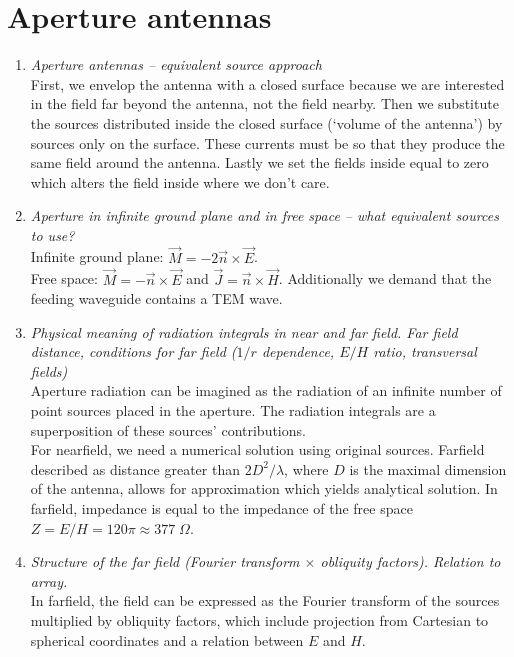 \documentclass[11pt,a4paper]{article}
\begin{document}
\section{Aperture antennas}
\begin{enumerate}

    \item \emph{Aperture antennas -- equivalent source approach}\\
    First, we envelop the antenna with a closed surface because we are interested in the field far beyond the antenna, not the field nearby. Then we substitute the sources distributed inside the closed surface (`volume of the antenna') by sources only on the surface. These currents must be so that they produce the same field around the antenna. Lastly we set the fields inside equal to zero which alters the field inside where we don't care. 
    
    \item \emph{Aperture in infinite ground plane and in free space -- what equivalent sources to use?}\\
    Infinite ground plane: $\vec M = -2\vec n \times \vec E$.\\
    Free space: $\vec M = -\vec n \times \vec E$ and $\vec J = \vec n \times \vec H$. Additionally we demand that the feeding waveguide contains a TEM wave.
    
    \item \emph{Physical meaning of radiation integrals in near and far field. Far field distance, conditions for far field ($1/r$ dependence, $E/H$ ratio, transversal fields)}\\
    Aperture radiation can be imagined as the radiation of an infinite number of point sources placed in the aperture. The radiation integrals are a superposition of these sources' contributions.\\
    For nearfield, we need a numerical solution using original sources. Farfield described as distance greater than $2D^2/\lambda$, where $D$ is the maximal dimension of the antenna, allows for approximation which yields analytical solution. In farfield, impedance is equal to the impedance of the free space $Z = E/H = 120\pi \approx 377 \; \Omega$.
    
    \item \emph{Structure of the far field (Fourier transform $\times$ obliquity factors). Relation to array.}\\
    In farfield, the field can be expressed as the Fourier transform of the sources multiplied by obliquity factors, which include projection from Cartesian to spherical coordinates and a relation between $E$ and $H$.


\end{enumerate}
\end{document}
